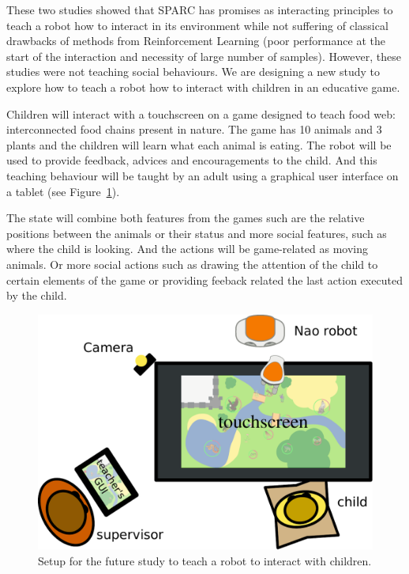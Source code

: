 \documentclass[conference]{IEEEtran}
\begin{document}
These two studies showed that SPARC has promises as interacting principles to
teach a robot how to interact in its environment while not suffering of
classical drawbacks of methods from Reinforcement Learning (poor performance at
the start of the interaction and necessity of large number of samples). However,
these studies were not teaching social behaviours. We are designing a new study
to explore how to teach a robot how to interact with children in an educative
game. 

Children will interact with a touchscreen on a game designed to teach food web:
interconnected food chains present in nature. The game has 10 animals and 3
plants and the children will learn what each animal is eating.  The robot will
be used to provide feedback, advices and encouragements to the child. And this
teaching behaviour will be taught by an adult using a graphical user interface
on a tablet (see Figure~\ref{fig:setup}).

The state will combine both features from the games such are the relative
positions between the animals or their status and more social features, such as
where the child is looking. And the actions will be game-related as moving
animals. Or more social actions such as drawing the attention of the child to
certain elements of the game or providing feeback related the last action
executed by the child.

\begin{figure}
    \centering
    \includegraphics[width=0.99\linewidth]{setup.pdf}
    \caption{Setup for the future study to teach a robot to interact with
    children.}
    \label{fig:setup}
\end{figure}
\end{document}
